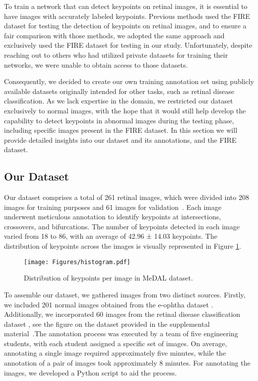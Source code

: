 \documentclass[10pt,twocolumn,letterpaper]{article}
\begin{document}
To train a network that can detect keypoints on retinal images, it is essential to have images with accurately labeled keypoints. Previous methods used the FIRE dataset for testing the detection of keypoints on retinal images, and to ensure a fair comparison with those methods, we adopted the same approach and exclusively used the FIRE dataset for testing in our study. Unfortunately, despite reaching out to others who had utilized private datasets for training their networks, we were unable to obtain access to those datasets.

Consequently, we decided to create our own training annotation set using publicly available datasets originally intended for other tasks, such as retinal disease classification. As we lack expertise in the domain, we restricted our dataset exclusively to normal images, with the hope that it would still help develop the capability to detect keypoints in abnormal images during the testing phase, including specific images present in the FIRE dataset. In this section we will provide detailed insights into our dataset and its annotations, and the FIRE dataset.


\subsection{Our Dataset}

Our dataset comprises a total of 261 retinal images, which were divided into 208 images for training purposes and 61 images for validation~\cite{medal2023}. Each image underwent meticulous annotation to identify keypoints at intersections, crossovers, and bifurcations. The number of keypoints detected in each image varied from 18 to 86, with an average of 42.96 ± 14.03 keypoints. The distribution of keypoints across the images is visually represented in Figure \ref{dist}.


\begin{figure}
  \centering
  \texttt{[image: Figures/histogram.pdf]}
  \caption{Distribution of keypoints per image in MeDAL dataset.}
  \label{dist}
\end{figure}

To assemble our dataset, we gathered images from two distinct sources. Firstly, we included 201 normal images obtained from the e-ophtha dataset \cite{e-ophtha}. Additionally, we incorporated 60 images from the retinal disease classification dataset \cite{RetinalDisease}, see the figure on the dataset provided in the supplemental material~\cite{Authors14}.The annotation process was executed by a team of five engineering students, with each student assigned a specific set of images. On average, annotating a single image required approximately five minutes, while the annotation of a pair of images took approximately 8 minutes. For annotating the images, we developed a Python script to aid the process.
\end{document}
